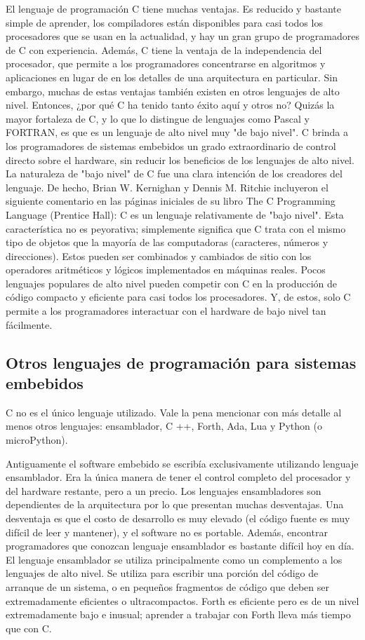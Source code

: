 \documentclass[output=paper, 
colorlinks,
citecolor=brown,
newtxmath
]{langscibook}
\begin{document}
El lenguaje de programación C tiene muchas ventajas. 
Es reducido y bastante simple de aprender, los compiladores están disponibles 
para casi todos los procesadores que se usan en la actualidad, y hay un 
gran grupo de programadores de C con experiencia. 
Además, C tiene la ventaja de la independencia del procesador, 
que permite a los programadores concentrarse en algoritmos y aplicaciones 
en lugar de en los detalles de una arquitectura en particular. 
Sin embargo, muchas de estas ventajas también existen 
en otros lenguajes de alto nivel. Entonces, ¿por qué C ha tenido 
tanto éxito aquí y otros no?
Quizás la mayor fortaleza de C, y lo que lo distingue de lenguajes 
como Pascal y FORTRAN, es que es un lenguaje de alto nivel 
muy "de bajo nivel". 
C brinda a los programadores de sistemas embebidos un grado 
extraordinario de control directo sobre el hardware, sin 
reducir los beneficios de los lenguajes de alto nivel. 
La naturaleza de "bajo nivel" de C fue una clara intención 
de los creadores del lenguaje. De hecho, Brian W. Kernighan y Dennis M. 
Ritchie incluyeron el siguiente comentario en las páginas 
iniciales de su libro The C Programming Language (Prentice Hall):
C es un lenguaje relativamente de "bajo nivel". Esta característica no es peyorativa; 
simplemente significa que C trata con el mismo tipo de objetos 
que la mayoría de las computadoras (caracteres, números y direcciones). 
Estos pueden ser combinados y cambiados de sitio con los operadores
aritméticos y lógicos implementados en máquinas reales.
Pocos lenguajes populares de alto nivel pueden competir con C 
en la producción de código compacto y eficiente para casi 
todos los procesadores. Y, de estos, solo C permite a los 
programadores interactuar con el hardware de bajo nivel tan fácilmente.




\subsection {Otros lenguajes de programación para sistemas embebidos}

C no es el único lenguaje utilizado. Vale la pena mencionar con 
más detalle al menos otros lenguajes: ensamblador, C ++, Forth, Ada, Lua y Python (o microPython).

Antiguamente el software embebido se escribía exclusivamente utilizando lenguaje ensamblador.
Era la única manera de tener el control completo del procesador y del hardware restante, pero a un precio.
Los lenguajes ensambladores son dependientes de la arquitectura por lo que presentan muchas desventajas. 
Una desventaja es que el costo de desarrollo es muy elevado (el código fuente es muy 
difícil de leer y mantener), y el software no es portable. 
Además, encontrar programadores que conozcan lenguaje ensamblador es bastante difícil hoy en día.
El lenguaje ensamblador se utiliza principalmente como un complemento a los lenguajes de
alto nivel. Se utiliza para escribir una porción del código de arranque de un sistema,
o en pequeños fragmentos de código que deben ser extremadamente eficientes o ultracompactos.
Forth es eficiente pero es de un nivel extremadamente bajo e inusual; aprender a trabajar 
con Forth lleva más tiempo que con C.
\end{document}
